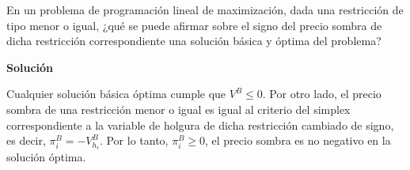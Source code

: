 En un problema de programación lineal de maximización, dada una restricción de tipo menor o igual, ¿qué se puede afirmar sobre el signo del precio sombra de dicha restricción correspondiente una solución básica y óptima del problema?
\vspace{1cm}

\noindent
\textbf{Solución}

\vspace{0.5cm}

Cualquier solución básica óptima cumple que $V^B \leq 0$. Por otro lado, el precio sombra de una restricción menor o igual es igual al criterio del simplex correspondiente a la variable de holgura de dicha restricción cambiado de signo, es decir, $\pi^B_i = -V^B_{h_i}$. Por lo tanto, $\pi^B_i \geq 0$, el precio sombra es no negativo en la solución óptima.
